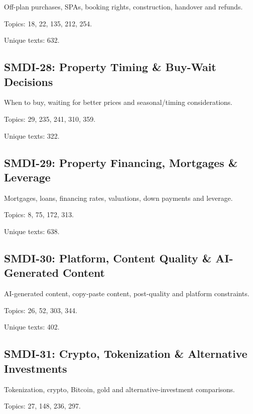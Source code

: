 \documentclass[10pt]{article}
\begin{document}
Off-plan purchases, SPAs, booking rights, construction, handover and refunds.

\par Topics: 18, 22, 135, 212, 254.

\par Unique texts: 632.

\subsection*{SMDI-28: Property Timing \& Buy-Wait Decisions}

When to buy, waiting for better prices and seasonal/timing considerations.

\par Topics: 29, 235, 241, 310, 359.

\par Unique texts: 322.

\subsection*{SMDI-29: Property Financing, Mortgages \& Leverage}

Mortgages, loans, financing rates, valuations, down payments and leverage.

\par Topics: 8, 75, 172, 313.

\par Unique texts: 638.

\subsection*{SMDI-30: Platform, Content Quality \& AI-Generated Content}

AI-generated content, copy-paste content, post-quality and platform constraints.

\par Topics: 26, 52, 303, 344.

\par Unique texts: 402.

\subsection*{SMDI-31: Crypto, Tokenization \& Alternative Investments}

Tokenization, crypto, Bitcoin, gold and alternative-investment comparisons.

\par Topics: 27, 148, 236, 297.
\end{document}
